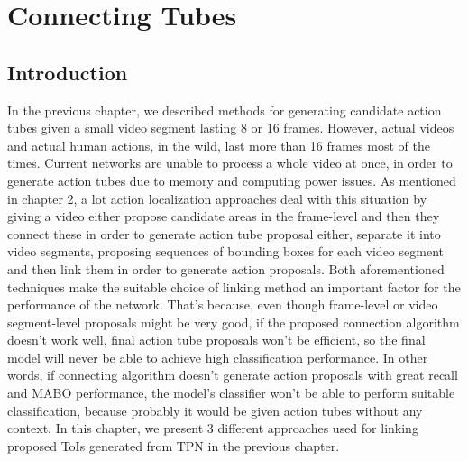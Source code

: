 





% 

\chapter{Connecting Tubes}
\section{Introduction}
In the previous chapter, we described methods for generating candidate action tubes given a small video segment lasting 8 or 16 frames. However, actual videos
and actual human actions, in the  wild, last more than 16 frames most of the times. Current networks are unable to process a whole video at once, in order to generate action tubes
due to memory and computing power issues.  As mentioned in chapter 2, a lot action localization approaches deal with this situation by giving a video either
propose candidate areas in the frame-level and then they connect these in order to generate action tube proposal either, separate it into video segments,
proposing  sequences of bounding boxes for each video segment and then link them in order to generate action proposals. Both aforementioned techniques make
the suitable choice of linking method an important factor for the performance of the network. That's because, even though frame-level or video segment-level proposals
might be very good, if the proposed connection algorithm doesn't work well, final action tube proposals won't be efficient, so the final model will never
be able to achieve high classification performance. In other words, if connecting algorithm doesn't generate action proposals with great recall and MABO performance,
the model's classifier won't be able to perform suitable classification, because probably it would be given action tubes without any context.
In this chapter, we present 3 different approaches used for linking proposed ToIs generated from TPN in the previous chapter.

